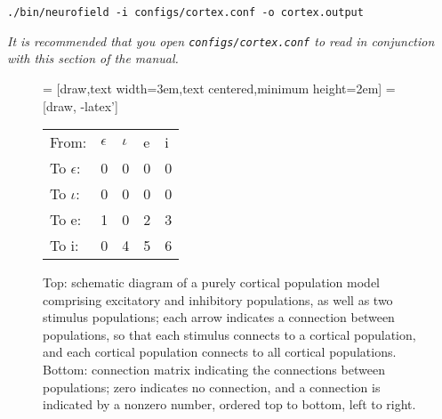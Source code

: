 \documentclass[12pt,a4paper]{article}
\newcommand{\type}[1]{{\small\small\tt #1} }
\begin{document}
\begin{lstlisting}
./bin/neurofield -i configs/cortex.conf -o cortex.output
\end{lstlisting}

{\em It is recommended that you open \type{configs/cortex.conf} to read in conjunction with this section of the manual.}
\vspace{24pt}

\begin{figure}[h!]
\begin{center}
 = [draw,text width=3em,text centered,minimum height=2em]
 = [draw, -latex']
\end{center}
\vspace{0.2cm}
\begin{center}
\begin{tabular}{ l l l l l }
    From:& $\epsilon$ & $\iota$ & e & i \\
    To $\epsilon$:& 0 & 0 & 0 & 0 \\
    To $\iota$:& 0 & 0 & 0 & 0 \\
    To e:& 1 & 0 & 2 & 3 \\
    To i:& 0 & 4 & 5 & 6
\end{tabular}
\end{center}
\caption{Top: schematic diagram of a purely cortical population model comprising excitatory and inhibitory populations, as well as two stimulus populations; each arrow indicates a connection between populations, so that each stimulus connects to a cortical population, and each cortical population connects to all cortical populations. Bottom: connection matrix indicating the connections between populations; zero indicates no connection, and a connection is indicated by a nonzero number, ordered top to bottom, left to right.}
\label{fig:cortical}
\end{figure}
\end{document}
